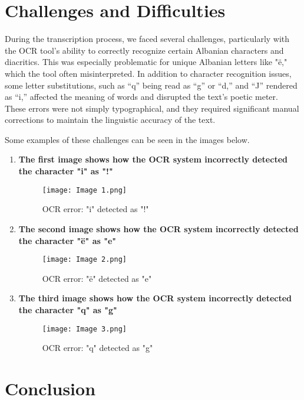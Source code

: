 \documentclass[12pt]{article}
\begin{document}
\section*{Challenges and Difficulties}
During the transcription process, we faced several challenges, particularly with the OCR tool’s ability to correctly recognize certain Albanian characters and diacritics. This was especially problematic for unique Albanian letters like "ë," which the tool often misinterpreted. In addition to character recognition issues, some letter substitutions, such as “q” being read as “g” or “d,” and “J” rendered as “i,” affected the meaning of words and disrupted the text’s poetic meter. These errors were not simply typographical, and they required significant manual corrections to maintain the linguistic accuracy of the text.

    \vspace{1em}
Some examples of these challenges can be seen in the images below.

\begin{enumerate}
    \item \textbf{The first image shows how the OCR system incorrectly detected the character "i" as "!"}
    \begin{figure}[h!]
        \centering
        \texttt{[image: Image 1.png]}
        \caption{OCR error: "i" detected as "!"}
        \label{fig:ocr_error1}
    \end{figure}

    \item \textbf{The second image shows how the OCR system incorrectly detected the character "ë" as "e"}
    \begin{figure}[h!]
        \centering
        \texttt{[image: Image 2.png]}
        \caption{OCR error: "ë" detected as "e"}
        \label{fig:ocr_error2}
    \end{figure}

    \item \textbf{The third image shows how the OCR system incorrectly detected the character "q" as "g"}
    \begin{figure}[h!]
        \centering
        \texttt{[image: Image 3.png]}
        \caption{OCR error: "q" detected as "g"}
        \label{fig:ocr_error3}
    \end{figure}
\end{enumerate}

\section*{Conclusion}
\end{document}
